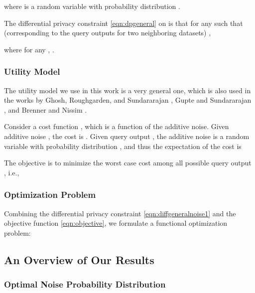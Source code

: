 where  is a random variable with probability distribution .


The differential privacy constraint \eqref{eqn:dpgeneral}    on  is that for any  such that  (corresponding to the query outputs for two neighboring datasets) ,

where for any ,  .

\subsubsection{Utility Model}

The utility model we use in this work is a very general one, which is also used in the works by Ghosh, Roughgarden, and Sundararajan \cite{Ghosh09}, Gupte and  Sundararajan \cite{minimax10}, and Brenner and Nissim \cite{Nissim10}.

Consider a cost function , which is a function of the additive noise. Given additive noise , the cost is . Given query output , the additive noise is a random variable with probability distribution , and thus the expectation of the cost is


The objective is to minimize the worst case cost among all possible query output , i.e.,



\subsubsection{Optimization Problem}

Combining the differential privacy constraint \eqref{eqn:diffgeneralnoise1} and the objective function \eqref{eqn:objective}, we formulate a functional optimization problem:















\subsection{An Overview of Our Results}













\subsubsection{Optimal Noise Probability Distribution}

